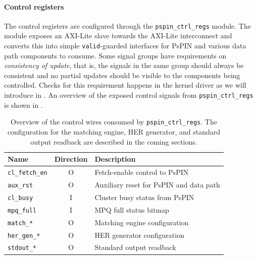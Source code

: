 \paragraph{Control registers} The control registers are configured through the \texttt{pspin\_\-ctrl\_\-regs} module.  The module exposes an AXI-Lite slave towards the AXI-Lite interconnect and converts this into simple \texttt{valid}-guarded interfaces  for PsPIN and various data path components to consume.  Some signal groups have requirements on \emph{consistency of update}, that is, the signals in the same group should always be consistent and no partial updates should be visible to the components being controlled.  Checks for this requirement happens in the kernel driver as we will introduce in .  An overview of the exposed control signals from \texttt{pspin\_\-ctrl\_\-regs} is shown in .

\begin{table}[ht]
    \centering
    \begin{tabular}{lcl}
    \toprule
    Name & Direction & Description \\ \midrule
    \texttt{cl\_fetch\_en} & O & Fetch-enable control to PsPIN \\
    \texttt{aux\_rst} & O & Auxiliary reset for PsPIN and data path \\
    \texttt{cl\_busy} & I & Cluster busy status from PsPIN \\
    \texttt{mpq\_full} & I & MPQ full status bitmap \\
    \texttt{match\_*} & O & Matching engine configuration \\
    \texttt{her\_gen\_*} & O & HER generator configuration \\
    \texttt{stdout\_*} & O & Standard output readback \\
    \bottomrule
    \end{tabular}
    \caption{Overview of the control wires consumed by \texttt{pspin\_ctrl\_regs}.  The configuration for the matching engine, HER generator, and standard output readback are described in the coming sections. }
    \label{tab:ctrl-signals}
\end{table}

